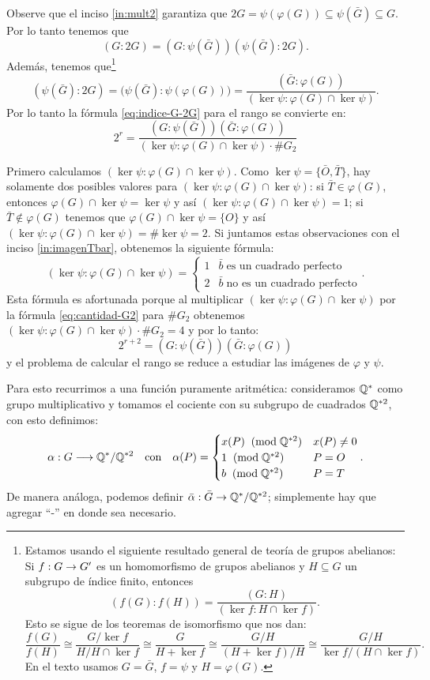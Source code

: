\documentclass[../../tesis_maestria]{subfiles}
\begin{document}
Observe que el inciso \ref{in:mult2} garantiza que $2G=\psi(\varphi(G))\subseteq\psi(\bar{G})\subseteq G$. Por lo tanto tenemos que
\[
	(G:2G)=(G:\psi(\bar{G}))(\psi(\bar{G}):2G).
\]
Además, tenemos que\footnote{Estamos usando el siguiente resultado general de teoría de grupos abelianos: Si $f:G\rightarrow G'$ es un homomorfismo de grupos abelianos y $H\subseteq G$ un subgrupo de índice finito, entonces
\[
	(f(G):f(H))=\frac{(G:H)}{(\ker f:H\cap\ker f)}.
\]
Esto se sigue de los teoremas de isomorfismo que nos dan:
\[
	\frac{f(G)}{f(H)}\cong\frac{G/\ker f}{H/H\cap\ker f}\cong\frac{G}{H+\ker f}\cong\frac{G/H}{(H+\ker f)/H}\cong\frac{G/H}{\ker f/(H\cap\ker f)}.
\]
En el texto usamos $G=\bar{G}$, $f=\psi$ y $H=\varphi(G)$.}
\[
	(\psi(\bar{G}):2G)=\big(\psi(\bar{G}):\psi(\varphi(G))\big)=\frac{(\bar{G}:\varphi(G))}{(\ker\psi:\varphi(G)\cap\ker\psi)}.
\]
Por lo tanto la fórmula \eqref{eq:indice-G-2G} para el rango se convierte en:
\[
	2^r=\frac{(G:\psi(\bar{G}))(\bar{G}:\varphi(G))}{(\ker\psi:\varphi(G)\cap\ker\psi)\cdot\# G_2}
\]

Primero calculamos $(\ker\psi:\varphi(G)\cap\ker\psi)$. Como $\ker\psi=\{\bar{O},\bar{T}\}$, hay solamente dos posibles valores para $(\ker\psi:\varphi(G)\cap\ker\psi)$: si $\bar{T}\in\varphi(G)$, entonces $\varphi(G)\cap\ker\psi=\ker\psi$ y as\'i $(\ker\psi:\varphi(G)\cap\ker\psi)=1$; si $\bar{T}\not\in\varphi(G)$ tenemos que $\varphi(G)\cap\ker\psi=\{O\}$ y así $(\ker\psi:\varphi(G)\cap\ker\psi)=\#\ker\psi=2$. Si juntamos estas observaciones con el inciso \ref{in:imagenTbar}, obtenemos la siguiente fórmula:
\[
	(\ker\psi:\varphi(G)\cap\ker\psi)=
	\begin{cases}
		1 & \bar{b}\;\text{es un cuadrado perfecto}\\
		2 & \bar{b}\;\text{no es un cuadrado perfecto}
	\end{cases}.
\]
Esta fórmula es afortunada porque al multiplicar $(\ker\psi:\varphi(G)\cap\ker\psi)$ por la fórmula \eqref{eq:cantidad-G2} para $\# G_2$ obtenemos $(\ker\psi:\varphi(G)\cap\ker\psi)\cdot\# G_2=4$ y por lo tanto:
\begin{equation}\label{eq:rango-indices-2}
2^{r+2}=(G:\psi(\bar{G}))(\bar{G}:\varphi(G))
\end{equation}
y el problema de calcular el rango se reduce a estudiar las imágenes de $\varphi$ y $\psi$.

Para esto recurrimos a una función puramente aritmética: consideramos $\mathbb{Q}^*$ como grupo multiplicativo y tomamos el cociente con su subgrupo de cuadrados $\mathbb{Q}^{*2}$, con esto definimos:
\[
	\alpha:G\longrightarrow\mathbb{Q}^*/\mathbb{Q}^{*2}\quad\text{con}\quad \alpha(P)=
	\begin{cases}
		x(P) \;\;(\mathrm{mod}\; \mathbb{Q}^{*2}) & x(P)\neq0\\
		1 \;\;(\mathrm{mod}\; \mathbb{Q}^{*2}) & P=O\\
		b \;\;(\mathrm{mod}\; \mathbb{Q}^{*2}) & P=T
	\end{cases}.
\]
De manera análoga, podemos definir $\bar{\alpha}:\bar{G}\rightarrow\mathbb{Q}^*/\mathbb{Q}^{*2}$; simplemente hay que agregar ``-'' en donde sea necesario.
\end{document}
